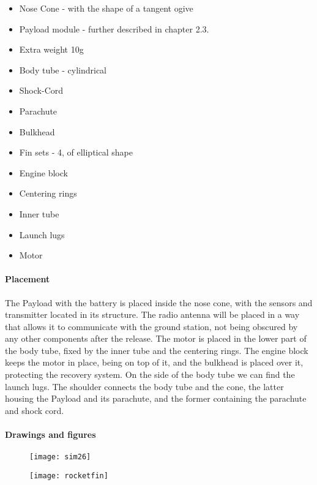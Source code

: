 \begin{itemize}
 \item Nose Cone - with the shape of a tangent ogive
 \item Payload module - further described in chapter 2.3.
 \item Extra weight 10g
 \item Body tube - cylindrical
 \item Shock-Cord
 \item Parachute
 \item Bulkhead
 \item Fin sets - 4, of elliptical shape
 \item Engine block
 \item Centering rings
 \item Inner tube
 \item Launch lugs
 \item Motor
\end{itemize}

\paragraph{Placement}

The Payload with the battery is placed inside the nose cone, with the sensors and transmitter located in its structure. The radio antenna will be placed in a way that allows it to communicate with the ground station, not being obscured by any other components after the release. The motor is placed in the lower part of the body tube, fixed by the inner tube and the centering rings. The engine block keeps the motor in place, being on top of it, and the bulkhead is placed over it, protecting the recovery system. On the side of the body tube we can find the launch lugs. The shoulder connects the body tube and the cone, the latter housing the Payload and its parachute, and the former containing the parachute and shock cord.

\paragraph{Drawings and figures}

\begin{figure}[H]
\centering
\texttt{[image: sim26]}
\caption{}
\end{figure}

\begin{figure}[H]
\centering
\texttt{[image: rocketfin]}
\caption{}
\end{figure}

